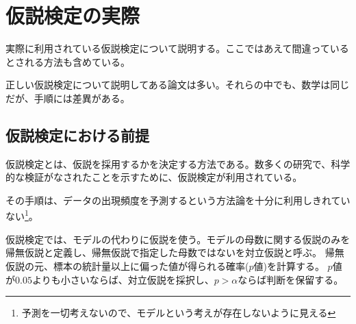 \chapter{仮説検定の実際}
実際に利用されている仮説検定について説明する。ここではあえて間違っているとされる方法も含めている。

正しい仮説検定について説明してある論文は多い。それらの中でも、数学は同じだが、手順には差異がある。


\section{仮説検定における前提}
仮説検定とは、仮説を採用するかを決定する方法である。数多くの研究で、科学的な検証がなされたことを示すために、仮説検定が利用されている。

その手順は、データの出現頻度を予測するという方法論を十分に利用しきれていない\footnote{予測を一切考えないので、モデルという考えが存在しないように見える}。


仮説検定では、モデルの代わりに仮説を使う。モデルの母数に関する仮説のみを帰無仮説と定義し、帰無仮説で指定した母数ではないを対立仮説と呼ぶ。
帰無仮説の元、標本の統計量以上に偏った値が得られる確率($p$値)を計算する。
$p$値が$0.05$よりも小さいならば、対立仮説を採択し、$p>\alpha$ならば判断を保留する。

